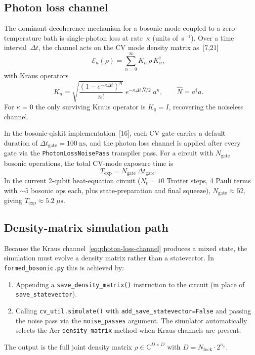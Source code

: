 \documentclass[11pt]{article}
\begin{document}
\subsection{Photon loss channel}
The dominant decoherence mechanism for a bosonic mode coupled to a zero-temperature
bath is single-photon loss at rate~$\kappa$ (units of~s$^{-1}$).
Over a time interval~$\Delta t$, the channel acts on the CV mode density matrix as~[7,21]
\begin{equation}
\mathcal{E}_\kappa(\rho)=\sum_{n=0}^{\infty}K_n\,\rho\,K_n^\dagger,
\label{eq:photon-loss-channel}
\end{equation}
with Kraus operators
\begin{equation}
K_n=\sqrt{\frac{(1-e^{-\kappa\Delta t})^n}{n!}}\;
e^{-\kappa\Delta t\,\hat{N}/2}\;a^n,
\qquad
\hat{N}=a^\dagger a.
\label{eq:kraus-photon-loss}
\end{equation}
For $\kappa=0$ the only surviving Kraus operator is $K_0=I$, recovering the noiseless channel.

In the bosonic-qiskit implementation~[16], each CV gate carries a default
duration of $\Delta t_{\mathrm{gate}}=100\;\text{ns}$, and the photon loss channel
is applied after every gate via the \texttt{PhotonLossNoisePass} transpiler pass.
For a circuit with $N_{\mathrm{gate}}$ bosonic operations, the total CV-mode exposure
time is
\begin{equation}
T_{\mathrm{exp}}=N_{\mathrm{gate}}\,\Delta t_{\mathrm{gate}}.
\label{eq:exposure-time}
\end{equation}
In the current 2-qubit heat-equation circuit ($N_t=10$ Trotter steps,
4 Pauli terms with $\sim\!5$ bosonic ops each, plus state-preparation and
final squeeze), $N_{\mathrm{gate}}\approx 52$, giving
$T_{\mathrm{exp}}\approx 5.2\;\mu\text{s}$.

\subsection{Density-matrix simulation path}
\label{sec:dm-path}
Because the Kraus channel~\eqref{eq:photon-loss-channel} produces a
mixed state, the simulation must evolve a density matrix rather than a
statevector.
In \texttt{formed\_bosonic.py} this is achieved by:
\begin{enumerate}
\item Appending a \texttt{save\_density\_matrix()} instruction to the
  circuit (in place of \texttt{save\_statevector}).
\item Calling \texttt{cv\_util.simulate()} with
  \texttt{add\_save\_statevector=False} and passing the noise pass
  via the \texttt{noise\_passes} argument.
  The simulator automatically selects the Aer \texttt{density\_matrix}
  method when Kraus channels are present.
\end{enumerate}
The output is the full joint density matrix
$\rho\in\mathbb{C}^{D\times D}$ with $D=N_{\mathrm{fock}}\cdot 2^{n_q}$.
\end{document}
